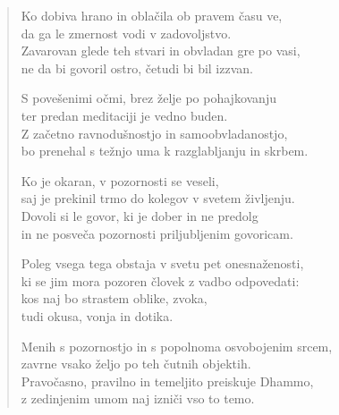 \clearpage
\begin{verse}

Ko dobiva hrano in oblačila ob pravem času ve,\\
da ga le zmernost vodi v zadovoljstvo.\\
Zavarovan glede teh stvari in obvladan gre po vasi,\\
ne da bi govoril ostro, četudi bi bil izzvan.

S povešenimi očmi, brez želje po pohajkovanju\\
ter predan meditaciji je vedno buden.\\
Z začetno ravnodušnostjo in samoobvladanostjo,\\
bo prenehal s težnjo uma k razglabljanju in skrbem.

Ko je okaran, v pozornosti se veseli,\\
saj je prekinil trmo do kolegov v svetem življenju.\\
Dovoli si le govor, ki je dober in ne predolg\\
in ne posveča pozornosti priljubljenim govoricam.

Poleg vsega tega obstaja v svetu pet onesnaženosti,\\
ki se jim mora pozoren človek z vadbo odpovedati:\\
kos naj bo strastem oblike, zvoka,\\
tudi okusa, vonja in dotika.

Menih s pozornostjo in s popolnoma osvobojenim srcem,\\
zavrne vsako željo po teh čutnih objektih.\\
Pravočasno, pravilno in temeljito preiskuje Dhammo,\\
z zedinjenim umom naj izniči vso to temo.

\end{verse}

